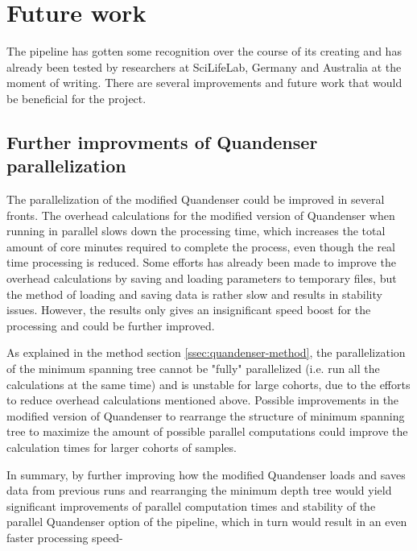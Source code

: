 \section{Future work}

The pipeline has gotten some recognition over the course of its creating and has already been tested by researchers at SciLifeLab, Germany and Australia at the moment of writing. There are several improvements and future work that would be beneficial for the project.

\subsection{Further improvments of Quandenser parallelization}
The parallelization of the modified Quandenser could be improved in several fronts. The overhead calculations for the modified version of Quandenser when running in parallel slows down the processing time, which increases the total amount of core minutes required to complete the process, even though the real time processing is reduced. Some efforts has already been made to improve the overhead calculations by saving and loading parameters to temporary files, but the method of loading and saving data is rather slow and results in stability issues. However, the results only gives an insignificant speed boost for the processing and could be further improved.

As explained in the method section \ref{ssec:quandenser-method}, the parallelization of the minimum spanning tree cannot be "fully" parallelized (i.e. run all the calculations at the same time) and is unstable for large cohorts, due to the efforts to reduce overhead calculations mentioned above. Possible improvements in the modified version of Quandenser to rearrange the structure of minimum spanning tree to maximize the amount of possible parallel computations could improve the calculation times for larger cohorts of samples.

In summary, by further improving how the modified Quandenser loads and saves data from previous runs and rearranging the minimum depth tree would yield significant improvements of parallel computation times and stability of the parallel Quandenser option of the pipeline, which in turn would result in an even faster processing speed-

